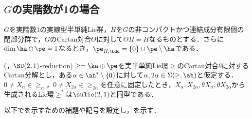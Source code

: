 \subsection{$ G$の実階数が1の場合}

\begin{thm}\label{thm:1216-main}
  $G$を実階数1の実線型半単純Lie群，$H$を$G$の非コンパクトかつ連結成分有限個の閉部分群で，$G$のCartan対合$\Theta$に対して$\Theta H = H$なるものとする．さらに$\dim \ha\cap\pe = 1$なるとき，$\pe_{H,\bdd} = \{0\}\cup\pe\setminus\ha $である．
\end{thm}

\begin{thm}\label{thm:0810}(\cite[p.~409, Theorem~3.1]{hel01}，$\SU(2,1) $-reduction)
  $\ge = \ka \oplus \pe$を実半単純Lie環$\ge$のCartan対合$\theta$に対する Cartan分解とし，ある$\alpha\in \ah^{*}\setminus\{0\} $に対して$\alpha,2\alpha\in \Sigma(\ge,\ah) $と仮定する．$0\neq X_{\alpha}\in \ge_{\alpha} $，$0\neq X_{2\alpha}\in \ge_{2\alpha} $を任意に固定したとき，$X_{\alpha},X_{2\alpha}, \theta X_{\alpha}, \theta X_{2\alpha} $から生成されるLie環$\ge^{*} $は$\sulie(2,1)$と同型である．
  
\end{thm}
以下でを示すための補題や記号を設定し，を示す．
